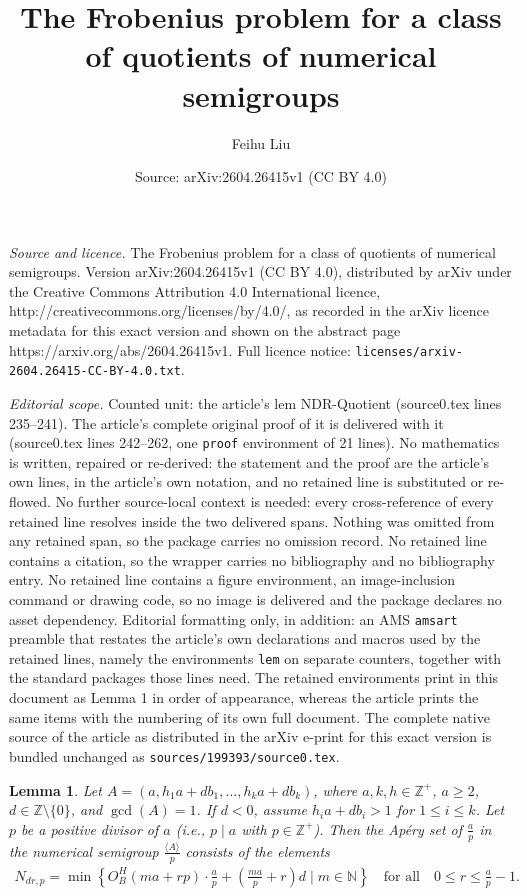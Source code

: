 \documentclass[10pt,a4paper]{amsart}
\title{The Frobenius problem for a class of quotients of numerical semigroups}
\author{Feihu Liu}
\date{Source: arXiv:2604.26415v1 (CC BY 4.0)}
\newtheorem{lem}{Lemma}
\begin{document}
\maketitle

\noindent\emph{Source and licence.} The Frobenius problem for a class of quotients of numerical semigroups. Version arXiv:2604.26415v1 (CC BY 4.0), distributed by arXiv under the Creative Commons Attribution 4.0 International licence, http://creativecommons.org/licenses/by/4.0/, as recorded in the arXiv licence metadata for this exact version and shown on the abstract page https://arxiv.org/abs/2604.26415v1. Full licence notice: \texttt{licenses/arxiv-2604.26415-CC-BY-4.0.txt}.\par\smallskip

\noindent\textit{Editorial scope.} Counted unit: the article's lem NDR-Quotient (source0.tex lines 235--241). The article's complete original proof of it is delivered with it (source0.tex lines 242--262, one \texttt{proof} environment of 21 lines). No mathematics is written, repaired or re-derived: the statement and the proof are the article's own lines, in the article's own notation, and no retained line is substituted or re-flowed.  No further source-local context is needed: every cross-reference of every retained line resolves inside the two delivered spans.  Nothing was omitted from any retained span, so the package carries no omission record.  No retained line contains a citation, so the wrapper carries no bibliography and no bibliography entry.  No retained line contains a figure environment, an image-inclusion command or drawing code, so no image is delivered and the package declares no asset dependency.  Editorial formatting only, in addition: an AMS \texttt{amsart} preamble that restates the article's own declarations and macros used by the retained lines, namely the environments \texttt{lem} on separate counters, together with the standard packages those lines need.  The retained environments print in this document as Lemma 1 in order of appearance, whereas the article prints the same items with the numbering of its own full document.  The complete native source of the article as distributed in the arXiv e-print for this exact version is bundled unchanged as \texttt{sources/199393/source0.tex}.
\begin{lem}\label{NDR-Quotient}
Let $A=(a, h_1a+db_1, \ldots, h_ka+db_k)$, where $a, k, h\in\mathbb{Z}^{+}$, $a\geq 2$, $d\in \mathbb{Z}\setminus \{0\}$, and $\gcd(A)=1$. If $d<0$, assume $h_ia+db_i>1$ for $1\leq i\leq k$.
Let $p$ be a positive divisor of $a$ (i.e., $p\mid a$ with $p\in \mathbb{Z}^{+}$). Then the Ap\'ery set of $\frac{a}{p}$ in the numerical semigroup $\frac{\langle A\rangle}{p}$ consists of the elements
\begin{align*}
N_{dr,p}=\min \left\{O_{B}^{H}(ma+rp) \cdot \frac{a}{p}+\left(\frac{ma}{p}+r\right)d \mid m\in \mathbb{N}\right\}\quad \text{for all}\quad 0\leq r\leq \frac{a}{p}-1.
\end{align*}
\end{lem}
\end{document}
